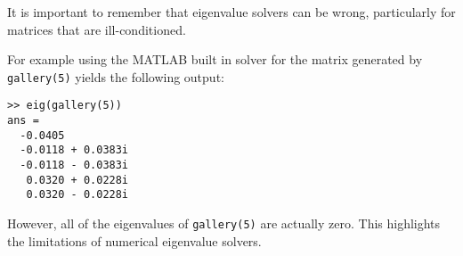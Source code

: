It is important to remember that eigenvalue solvers can be wrong, particularly for matrices that are ill-conditioned. 
\begin{matlab}
For example using the MATLAB built in solver for the matrix generated by {\tt gallery(5)} yields the following output:
\begin{lstlisting}[style=matlab]
>> eig(gallery(5))
ans =
  -0.0405          
  -0.0118 + 0.0383i
  -0.0118 - 0.0383i
   0.0320 + 0.0228i
   0.0320 - 0.0228i
\end{lstlisting}

However, all of the eigenvalues of {\tt gallery(5)} are actually zero. This highlights the limitations of numerical eigenvalue solvers.
\end{matlab}
